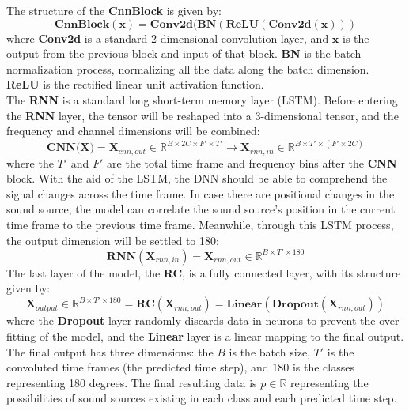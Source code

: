 The structure of the \textbf{CnnBlock} is given by:
\[
    \textbf{CnnBlock}(\mathbf{x}) = \textbf{Conv2d}(\textbf{BN}(\textbf{ReLU}(\textbf{Conv2d}(\mathbf{x})))
\]
where \textbf{Conv2d} is a standard 2-dimensional convolution layer, and \(\mathbf{x}\) is the output from the previous block and input of that block. \textbf{BN} is the batch normalization process, normalizing all the data along the batch dimension. \textbf{ReLU} is the rectified linear unit activation function.\\
The \textbf{RNN} is a standard long short-term memory layer (LSTM). Before entering the \textbf{RNN} layer, the tensor will be reshaped into a 3-dimensional tensor, and the frequency and channel dimensions will be combined:
\[
    \textbf{CNN(X)} = \mathbf{X}_{cnn,out} \in \mathbb{R}^{B \times 2C\times F' \times T'} \rightarrow \mathbf{X}_{rnn,in} \in \mathbb{R}^{B \times T' \times (F' \times 2C)}
\]
where the \(T'\) and \(F'\) are the total time frame and frequency bins after the \textbf{CNN} block. With the aid of the LSTM, the DNN should be able to comprehend the signal changes across the time frame. In case there are positional changes in the sound source, the model can correlate the sound source's position in the current time frame to the previous time frame. Meanwhile, through this LSTM process, the output dimension will be settled to 180:
\[
    \textbf{RNN}(\mathbf{X}_{rnn,in}) = \mathbf{X}_{rnn,out} \in \mathbb{R}^{B \times T' \times 180}
\]
The last layer of the model, the \textbf{RC}, is a fully connected layer, with its structure given by:
\[
    \mathbf{X}_{output} \in \mathbb{R}^{B \times T' \times 180} = \textbf{RC}(\mathbf{X}_{rnn,out}) = \textbf{Linear}(\textbf{Dropout}(\mathbf{X}_{rnn,out}))
\]
where the \textbf{Dropout} layer randomly discards data in neurons to prevent the over-fitting of the model, and the \textbf{Linear} layer is a linear mapping to the final output. The final output has three dimensions: the \(B\) is the batch size, \(T'\) is the convoluted time frames (the predicted time step), and \(180\) is the classes representing 180 degrees. The final resulting data is \(p \in \mathbb{R}\) representing the possibilities of sound sources existing in each class and each predicted time step.\\


